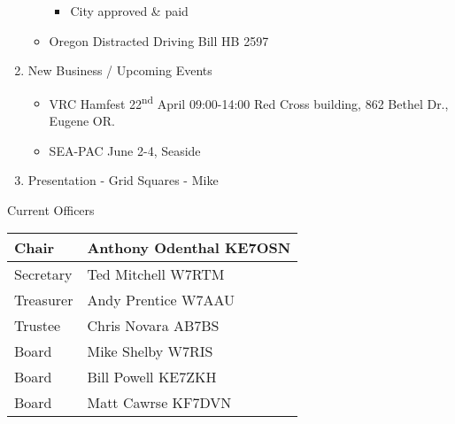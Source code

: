 \begin{enumerate}
\begin{itemize}
\begin{itemize}
						\item City approved \& paid
					\end{itemize}
				\item Oregon Distracted Driving Bill HB 2597
			\end{itemize}
		\item  New Business / Upcoming Events
			\begin{itemize}
				\item VRC Hamfest 22\textsuperscript{nd} April 09:00-14:00 Red Cross building, 862 Bethel Dr., Eugene OR.
				\item SEA-PAC June 2-4, Seaside
			\end{itemize}
		\item  Presentation - Grid Squares - Mike
	\end{enumerate}

	Current Officers \\
	\begin{tabular}{|l|l|} \hline
		Chair & Anthony Odenthal KE7OSN \\ \hline
		Secretary & Ted Mitchell W7RTM \\ \hline
		Treasurer & Andy Prentice W7AAU \\ \hline
		Trustee & Chris Novara AB7BS \\ \hline
		Board & Mike Shelby W7RIS \\ \hline
		Board & Bill Powell KE7ZKH \\ \hline
		Board & Matt Cawrse KF7DVN \\ \hline
	\end{tabular}
	
	\subsection*{}

